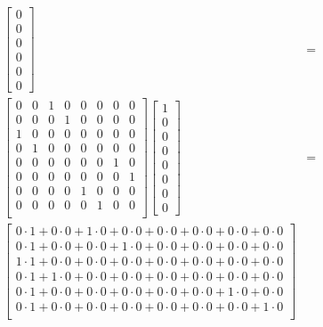 \begin{figure}[H]
\begin{align*}
\begin{bmatrix}
            0\\
            0\\
            0\\
            0\\
            0\\
            0
        \end{bmatrix}
        &=\\
        \begin{bmatrix}
            0 & 0 & 1 & 0 & 0 & 0 & 0 & 0\\
            0 & 0 & 0 & 1 & 0 & 0 & 0 & 0\\
            1 & 0 & 0 & 0 & 0 & 0 & 0 & 0\\
            0 & 1 & 0 & 0 & 0 & 0 & 0 & 0\\
            0 & 0 & 0 & 0 & 0 & 0 & 1 & 0\\
            0 & 0 & 0 & 0 & 0 & 0 & 0 & 1\\
            0 & 0 & 0 & 0 & 1 & 0 & 0 & 0\\
            0 & 0 & 0 & 0 & 0 & 1 & 0 & 0\\
        \end{bmatrix}
        \begin{bmatrix}
            1\\
            0\\
            0\\
            0\\
            0\\
            0\\
            0\\
            0
        \end{bmatrix}
        &=\\
        \begin{bmatrix}
            0\cdot 1 + 0\cdot 0 + 1\cdot 0 + 0\cdot 0 + 0\cdot 0 + 0\cdot 0 + 0\cdot 0 + 0\cdot 0\\
            0\cdot 1 + 0\cdot 0 + 0\cdot 0 + 1\cdot 0 + 0\cdot 0 + 0\cdot 0 + 0\cdot 0 + 0\cdot 0\\
            1\cdot 1 + 0\cdot 0 + 0\cdot 0 + 0\cdot 0 + 0\cdot 0 + 0\cdot 0 + 0\cdot 0 + 0\cdot 0\\
            0\cdot 1 + 1\cdot 0 + 0\cdot 0 + 0\cdot 0 + 0\cdot 0 + 0\cdot 0 + 0\cdot 0 + 0\cdot 0\\
            0\cdot 1 + 0\cdot 0 + 0\cdot 0 + 0\cdot 0 + 0\cdot 0 + 0\cdot 0 + 1\cdot 0 + 0\cdot 0\\
            0\cdot 1 + 0\cdot 0 + 0\cdot 0 + 0\cdot 0 + 0\cdot 0 + 0\cdot 0 + 0\cdot 0 + 1\cdot 0\\

\end{bmatrix}
\end{align*}
\end{figure}
